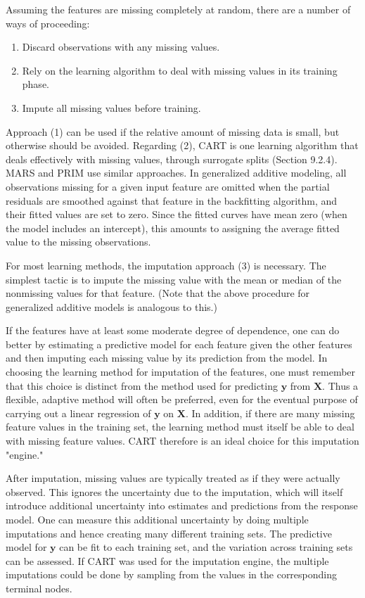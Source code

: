 \documentclass[10pt]{article}
\begin{document}
Assuming the features are missing completely at random, there are a number of ways of proceeding:

\begin{enumerate}
  \item Discard observations with any missing values.
  \item Rely on the learning algorithm to deal with missing values in its training phase.
  \item Impute all missing values before training.
\end{enumerate}

Approach (1) can be used if the relative amount of missing data is small, but otherwise should be avoided. Regarding (2), CART is one learning algorithm that deals effectively with missing values, through surrogate splits (Section 9.2.4). MARS and PRIM use similar approaches. In generalized additive modeling, all observations missing for a given input feature are omitted when the partial residuals are smoothed against that feature in the backfitting algorithm, and their fitted values are set to zero. Since the fitted curves have mean zero (when the model includes an intercept), this amounts to assigning the average fitted value to the missing observations.

For most learning methods, the imputation approach (3) is necessary. The simplest tactic is to impute the missing value with the mean or median of the nonmissing values for that feature. (Note that the above procedure for generalized additive models is analogous to this.)

If the features have at least some moderate degree of dependence, one can do better by estimating a predictive model for each feature given the other features and then imputing each missing value by its prediction from the model. In choosing the learning method for imputation of the features, one must remember that this choice is distinct from the method used for predicting $\mathbf{y}$ from $\mathbf{X}$. Thus a flexible, adaptive method will often be preferred, even for the eventual purpose of carrying out a linear regression of $\mathbf{y}$ on $\mathbf{X}$. In addition, if there are many missing feature values in the training set, the learning method must itself be able to deal with missing feature values. CART therefore is an ideal choice for this imputation "engine."

After imputation, missing values are typically treated as if they were actually observed. This ignores the uncertainty due to the imputation, which will itself introduce additional uncertainty into estimates and predictions from the response model. One can measure this additional uncertainty by doing multiple imputations and hence creating many different training sets. The predictive model for $\mathbf{y}$ can be fit to each training set, and the variation across training sets can be assessed. If CART was used for the imputation engine, the multiple imputations could be done by sampling from the values in the corresponding terminal nodes.
\end{document}
